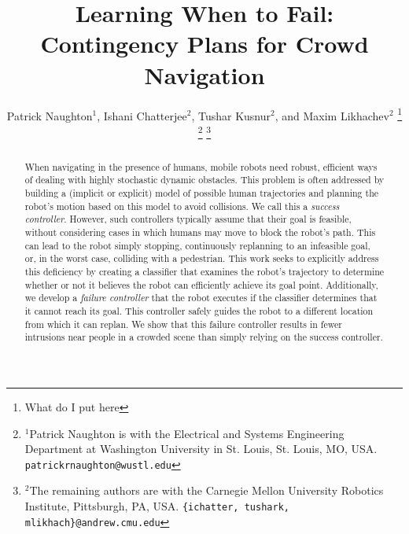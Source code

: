 \documentclass[letterpaper, 10 pt, conference]{ieeeconf}  %
\title{\LARGE \bf
	Learning When to Fail: Contingency Plans for Crowd Navigation
}
\author{Patrick Naughton$^{1}$, Ishani Chatterjee$^{2}$, Tushar Kusnur$^{2}$, and Maxim Likhachev$^{2}$%
\thanks{What do I put here}%
\thanks{$^{1}$Patrick Naughton is with the Electrical and Systems Engineering Department at Washington University in St. Louis, St. Louis, MO, USA. 
        {\tt\small patrickrnaughton@wustl.edu}}%
\thanks{$^{2}$The remaining authors are with the Carnegie Mellon University Robotics Institute, Pittsburgh, PA, USA.
        {\tt\small \{ichatter, tushark, mlikhach\}@andrew.cmu.edu}}%
}
\begin{document}
\newcolumntype{Z}{S[
	table-format=1.2,%
	round-mode=places,
	round-precision=2]}


\maketitle
\thispagestyle{empty}
\pagestyle{empty}


\begin{abstract}
	When navigating in the presence of humans, mobile robots need robust, efficient ways of dealing with highly stochastic dynamic obstacles. This problem is often addressed by building a (implicit or explicit) model of possible human trajectories and planning the robot's motion based on this model to avoid collisions. We call this a \textit{success controller}. However, such controllers typically assume that their goal is feasible, without considering cases in which humans may move to block the robot's path. This can lead to the robot simply stopping, continuously replanning to an infeasible goal, or, in the worst case, colliding with a pedestrian. This work seeks to explicitly address this deficiency by creating a classifier that examines the robot's trajectory to determine whether or not it believes the robot can efficiently achieve its goal point. Additionally, we develop a \textit{failure controller} that the robot executes if the classifier determines that it cannot reach its goal. This controller safely guides the robot to a different location from which it can replan. We show that this failure controller results in fewer intrusions near people in a crowded scene than simply relying on the success controller.
\end{abstract}


\end{document}
